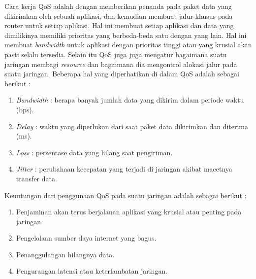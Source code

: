 Cara kerja QoS adalah dengan memberikan penanda pada paket data yang dikirimkan oleh sebuah aplikasi, dan kemudian membuat jalur khusus pada router untuk setiap aplikasi. Hal ini membuat setiap aplikasi dan data yang dimilikinya memiliki prioritas yang berbeda-beda satu dengan yang lain. Hal ini membuat \emph{bandwidth} untuk aplikasi dengan prioritas tinggi atau yang krusial akan pasti selalu tersedia. Selain itu QoS juga juga mengatur bagaimana suatu jaringan membagi \emph{resource} dan bagaimana dia mengontrol alokasi jalur pada suatu jaringan. Beberapa hal yang diperhatikan di dalam QoS adalah sebagai berikut :
\begin{enumerate}
  \item \emph{Bandwidth} : berapa banyak jumlah data yang dikirim dalam periode waktu (bps).
  \item \emph{Delay} : waktu yang diperlukan dari saat paket data dikirimkan dan diterima (ms).
  \item \emph{Loss} : persentase data yang hilang saat pengiriman.
  \item \emph{Jitter} : perubahaan kecepatan yang terjadi di jaringan akibat macetnya transfer data.
\end{enumerate}
Keuntungan dari penggunaan QoS pada suatu jaringan adalah sebagai berikut :
\begin{enumerate}
  \item Penjaminan akan terus berjalanan aplikasi yang krusial atau penting pada jaringan.
  \item Pengelolaan sumber daya internet yang bagus.
  \item Penanggulangan hilangnya data.
  \item Pengurangan latensi atau keterlambatan jaringan.
  
\end{enumerate}



